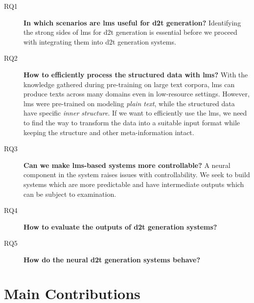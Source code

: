 \begin{description}
    \item[RQ1] \textbf{In which scenarios are \acp{lm} useful for \ac{d2t} generation?} Identifying the strong sides of \acp{lm} for \ac{d2t} generation is essential before we proceed with integrating them into \ac{d2t} generation systems.
    \item[RQ2] \textbf{How to efficiently process the structured data with \acp{lm}?} With the knowledge gathered during pre-training on large text corpora, \acp{lm} can produce texts across many domains even in low-resource settings. However, \acp{lm} were pre-trained on modeling \emph{plain text}, while the structured data have specific \emph{inner structure}. If we want to efficiently use the \acp{lm}, we need to find the way to transform the data into a suitable input format while keeping the structure and other meta-information intact.
    \item[RQ3] \textbf{Can we make \acp{lm}-based systems more controllable?} A neural component in the system raises issues with controllability. We seek to build systems which are more predictable and have intermediate outputs which can be subject to examination.
    \item[RQ4] \textbf{How to evaluate the outputs of \ac{d2t} generation systems?}
    \item[RQ5] \textbf{How do the neural \ac{d2t} generation systems behave?}
\end{description}



\section{Main Contributions}
\label{sec:contributions}



